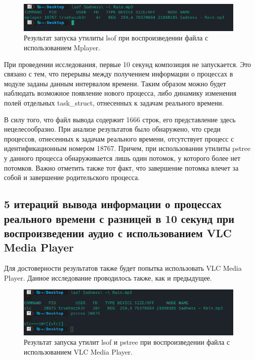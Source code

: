 \begin{figure}[H]
	\centering
	\includegraphics[scale=0.8]{img/mplayerlsof.png}
	\caption{Результат запуска утилиты lsof при воспроизведении файла с использованием Mplayer.}
	\label{fig:mplayerlsof}
\end{figure}

При проведении исследования, первые 10 секунд композиция не запускается. Это связано с тем, что перерывы между получением информации о процессах в модуле заданы данным интервалом времени. Таким образом можно будет наблюдать возможное появление нового процесса, либо динамику изменения полей отдельных task\_struct, отнесенных к задачам реального времени.

В силу того, что файл вывода содержит 1666 строк, его представление здесь нецелесообразно. При анализе результатов было обнаружено, что среди процессов, отнесенных к задачам реального времени, отсутствует процесс с идентификационным номером 18767. Причем, при использовании утилиты pstree у данного процесса обнаруживается лишь один потомок, у которого более нет потомков. Важно отметить также тот факт, что завершение потомка влечет за собой и завершение родительского процесса.

\subsection{5 итераций вывода информации о процессах реального времени с разницей в 10 секунд при воспроизведении аудио с использованием VLC Media Player}
Для достоверности результатов также будет попытка использовать VLC Media Player. Данное исследование проводилось также, как и предыдущее.

\begin{figure}[H]
	\centering
	\includegraphics[scale=0.8]{img/vlclsof.png}
	\caption{Результат запуска утилит lsof и pstree при воспроизведении файла с использованием VLC Media Player.}
	\label{fig:vlclsof}
\end{figure}


